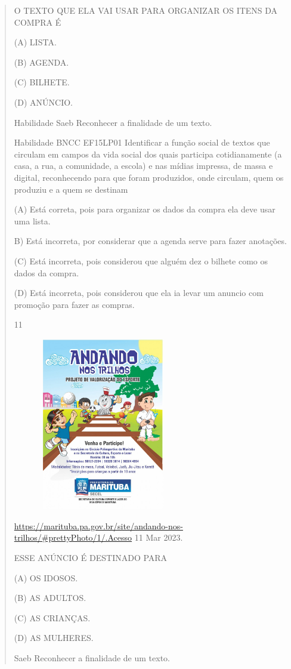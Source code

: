 \begin{verse}
{{{{{{{{{{{{{{{{{{{{O TEXTO QUE ELA VAI USAR PARA ORGANIZAR OS ITENS DA COMPRA É

(A) LISTA.

(B) AGENDA.

(C) BILHETE.

(D) ANÚNCIO.

Habilidade Saeb Reconhecer a finalidade de um texto.

Habilidade BNCC EF15LP01 Identificar a função social de textos que
circulam em campos da vida social dos quais participa cotidianamente (a
casa, a rua, a comunidade, a escola) e nas mídias impressa, de massa e
digital, reconhecendo para que foram produzidos, onde circulam, quem os
produziu e a quem se destinam

(A) Está correta, pois para organizar os dados da compra ela deve usar
uma lista.

B) Está incorreta, por considerar que a agenda serve para fazer
anotações.

(C) Está incorreta, pois considerou que alguém dez o bilhete como os
dados da compra.

(D) Está incorreta, pois considerou que ela ia levar um anuncio com
promoção para fazer as compras.

\num{11}

\includegraphics[width=3.11515in,height=2.97237in]{media/image170.jpeg}

\url{https://marituba.pa.gov.br/site/andando-nos-trilhos/\#prettyPhoto/1/.Acesso}
11 Mar 2023.

ESSE ANÚNCIO É DESTINADO PARA

(A) OS IDOSOS.

(B) AS ADULTOS.

(C) AS CRIANÇAS.

(D) AS MULHERES.

Saeb Reconhecer a finalidade de um texto.

}}}}}}}}}}}}}}}}}}}}
\end{verse}
